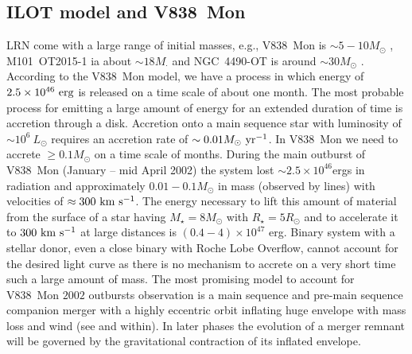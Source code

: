 \documentclass[a4paper,modern]{aastex62}
\def \kms{~\rm{km~s^{-1}}}
\begin{document}
\subsection{ILOT model and V838~Mon}
LRN come with a large range of initial masses, e.g., V838~Mon is $\sim5-10 M_\odot$ \citep{2006A&A...451..223T}, M101~OT2015-1 ia about $\sim18M_\cdot$   \citep{2017ApJ...834..107B} and NGC~4490-OT is around $\sim30 M_\odot$ \citep{2016MNRAS.458..950S}.
According to the V838~Mon model, we have a process in which energy of $2.5 \times 10^{46}~\rm{erg}$ is released on a time scale of about one month.
The most probable process for emitting a large amount of energy for an extended duration of time is accretion through a disk.
Accretion onto a main sequence star with luminosity of $\sim 10^6 ~ L_{\odot}$ requires an accretion rate of $\sim 0.01 M_{\odot}~\rm{yr}^{-1}$.
In V838~Mon we need to accrete $\geq 0.1 M_\odot$ on a time scale of months.
During the main outburst of V838~Mon (January -- mid April 2002) the system lost $\sim2.5\times10^{46}$ergs in radiation and approximately $0.01-0.1 M_\odot$ in mass (observed by lines) with velocities of $\approx 300 \kms$.
The energy necessary to lift this amount of material from the surface of a star having $M_{\star}=8M_\odot$ with $R_{\star}=5R_\odot$ and to accelerate it to $300 \kms$ at large distances is $(0.4-4)\times 10^{47}$ erg.
Binary system with a stellar donor, even a close binary with Roche Lobe Overflow, cannot account for the desired light curve as there is no mechanism to accrete on a very short time such a large amount of mass.
The most promising model to account for V838~Mon $2002$ outbursts observation \cite{2002IAUC.7785....1B} is a main sequence and pre-main sequence companion merger with a highly eccentric orbit inflating huge envelope with mass loss and wind (see \citep{2006A&A...451..223T,2007ASPC..363..280S} and within).
In later phases the evolution of a merger remnant will be governed by the gravitational contraction of its inflated envelope.
\end{document}
